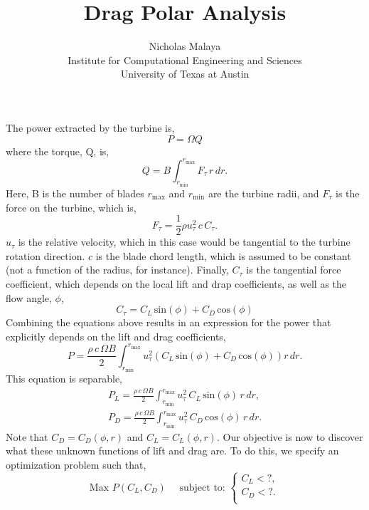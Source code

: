 \documentclass{article}
\title{\bf{Drag Polar Analysis}}
\author{Nicholas Malaya \\ Institute for Computational Engineering and Sciences \\ University of Texas at Austin} \date{}
\begin{document}
\maketitle

\newpage

The power extracted by the turbine is, 
\begin{equation}
 P = \Omega Q
\end{equation}
where the torque, Q, is, 
\begin{equation}
 Q = B \int_{r_{\text{min}}}^{r_{\text{max}}} F_{\tau}\, r\, dr.
\end{equation}
Here, B is the number of blades $r_{\text{max}}$ and $r_{\text{min}}$
are the turbine radii, and $F_{\tau}$ is the force on the turbine, which
is, 
\begin{equation}
 F_{\tau} = \frac{1}{2}\rho u_{\tau}^2 \, c \, C_{\tau}.
\end{equation}
$u_\tau$ is the relative velocity, which in this case would be
tangential to the turbine rotation direction. $c$ is the blade chord
length, which is assumed to be constant (not a function of the radius,
for instance). Finally, $C_{\tau}$ is the tangential force coefficient,
which depends on the local lift and drap coefficients, as well as the
flow angle, $\phi$, 
\begin{equation}
 C_{\tau} = C_L \,\text{sin}(\phi) + C_D \,\text{cos}(\phi)
\end{equation}
Combining the equations above results in an expression for the power
that explicitly depends on the lift and drag coefficients, 
\begin{equation*}
 P = \frac{\rho\, c\, \Omega B}{2}
  \int_{r_{\text{min}}}^{r_{\text{max}}} u_{\tau}^2 \left(C_L
						     \,\text{sin}(\phi)
						     + C_D
						     \,\text{cos}(\phi)
						    \right) r\,dr. 
\end{equation*}
This equation is separable, 
\begin{align*}
 P_L = \frac{\rho\, c\, \Omega B}{2}
  \int_{r_{\text{min}}}^{r_{\text{max}}} u_{\tau}^2 \, C_L \,\text{sin}(\phi)\, r\,dr, \\
 P_D = \frac{\rho\, c\, \Omega B}{2}
  \int_{r_{\text{min}}}^{r_{\text{max}}} u_{\tau}^2 \, C_D \,\text{cos}(\phi)\, r\,dr. 
\end{align*}
Note that $C_D = C_D(\phi,r)$ and $C_L = C_L(\phi,r)$. Our objective is
now to discover what these unknown functions of lift and drag are. To do
this, we specify an optimization problem such that, 
\begin{equation*} 
 \text{Max } P(C_L,C_D) \quad \text{ subject to: }
  \begin{cases}
    C_L < ?, \\
    C_D < ?. \\
  \end{cases}
\end{equation*}
\end{document}
